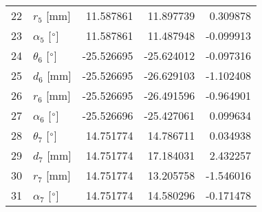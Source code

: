 \documentclass{standalone}%
\begin{document}
\begin{tabular}{llrrr}
22 &              $r_{5}$ [mm] &  11.587861 &  11.897739 &   0.309878 \\
23 &  $\alpha_{5}$ [$\degree$] &  11.587861 &  11.487948 &  -0.099913 \\
24 &  $\theta_{6}$ [$\degree$] & -25.526695 & -25.624012 &  -0.097316 \\
25 &              $d_{6}$ [mm] & -25.526695 & -26.629103 &  -1.102408 \\
26 &              $r_{6}$ [mm] & -25.526695 & -26.491596 &  -0.964901 \\
27 &  $\alpha_{6}$ [$\degree$] & -25.526696 & -25.427061 &   0.099634 \\
28 &  $\theta_{7}$ [$\degree$] &  14.751774 &  14.786711 &   0.034938 \\
29 &              $d_{7}$ [mm] &  14.751774 &  17.184031 &   2.432257 \\
30 &              $r_{7}$ [mm] &  14.751774 &  13.205758 &  -1.546016 \\
31 &  $\alpha_{7}$ [$\degree$] &  14.751774 &  14.580296 &  -0.171478 \\
\bottomrule
\end{tabular}
%
\end{document}
